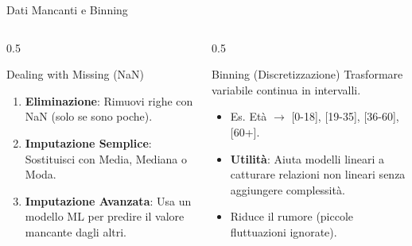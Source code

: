 \documentclass[aspectratio=169, 10pt]{beamer}
\begin{document}
\begin{frame}{Dati Mancanti e Binning}
    \begin{columns}[T]
        \begin{column}{0.5\textwidth}
            \begin{block}{Dealing with Missing (NaN)}
                \begin{enumerate}
                    \item \textbf{Eliminazione}: Rimuovi righe con NaN (solo se sono poche).
                    \item \textbf{Imputazione Semplice}: Sostituisci con Media, Mediana o Moda.
                    \item \textbf{Imputazione Avanzata}: Usa un modello ML per predire il valore mancante dagli altri.
                \end{enumerate}
            \end{block}
        \end{column}
        \begin{column}{0.5\textwidth}
            \begin{block}{Binning (Discretizzazione)}
                Trasformare variabile continua in intervalli.
                \begin{itemize}
                    \item Es. Età $\to$ [0-18], [19-35], [36-60], [60+].
                    \item \textbf{Utilità}: Aiuta modelli lineari a catturare relazioni non lineari senza aggiungere complessità.
                    \item Riduce il rumore (piccole fluttuazioni ignorate).
                \end{itemize}
            \end{block}
        \end{column}
    \end{columns}
\end{frame}
\end{document}
